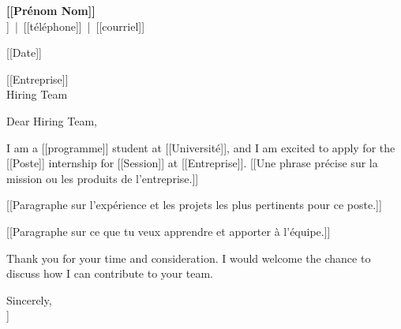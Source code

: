 \documentclass[11pt,letterpaper]{article}
\begin{document}
\textbf{[[Prénom Nom]]}\\
[[Ville]] \,|\, [[téléphone]] \,|\, [[courriel]]

[[Date]]

[[Entreprise]]\\
Hiring Team

Dear Hiring Team,

I am a [[programme]] student at [[Université]], and I am excited to apply for the [[Poste]] internship for [[Session]] at [[Entreprise]]. [[Une phrase précise sur la mission ou les produits de l'entreprise.]]

[[Paragraphe sur l'expérience et les projets les plus pertinents pour ce poste.]]

[[Paragraphe sur ce que tu veux apprendre et apporter à l'équipe.]]

Thank you for your time and consideration. I would welcome the chance to discuss how I can contribute to your team.

Sincerely,\\
[[Prénom Nom]]
\end{document}
